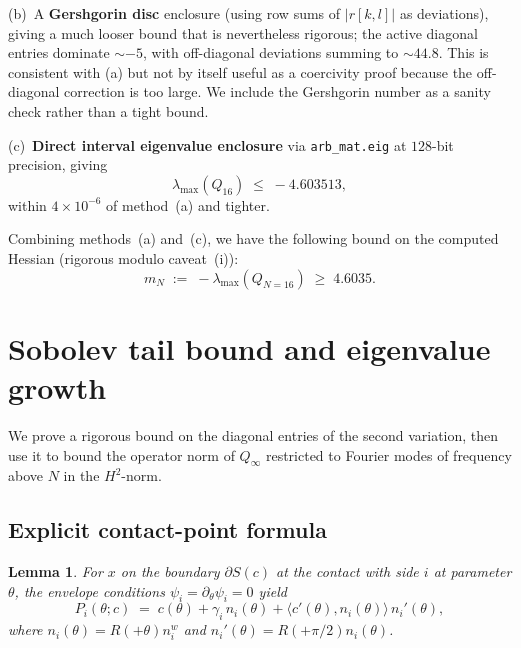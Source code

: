 \documentclass[11pt]{amsart}
\theoremstyle{plain}
\newtheorem{lemma}[theorem]{Lemma}
\theoremstyle{definition}
\begin{document}
(b)~A \textbf{Gershgorin disc} enclosure (using row sums of
$|r[k, l]|$ as deviations), giving a much looser bound that is
nevertheless rigorous; the active diagonal entries dominate
$\sim -5$, with off-diagonal deviations summing to $\sim 44.8$.  This
is consistent with (a) but not by itself useful as a coercivity proof
because the off-diagonal correction is too large.  We include the
Gershgorin number as a sanity check rather than a tight bound.

(c)~\textbf{Direct interval eigenvalue enclosure} via
\texttt{arb\_mat.eig} at $128$-bit precision, giving
\begin{equation}
  \lambda_{\max}(Q_{16}) \;\leq\; -4.603513,
\end{equation}
within $4 \times 10^{-6}$ of method~(a) and tighter.

Combining methods~(a) and~(c), we have the following bound on the
computed Hessian (rigorous modulo caveat~(i)):
\begin{equation}\label{eq:mN}
  \boxed{\; m_{N} \;:=\; -\lambda_{\max}(Q_{N=16})
                  \;\geq\; 4.6035. \;}
\end{equation}

\section{Sobolev tail bound and eigenvalue growth}\label{sec:tail-bound}

We prove a rigorous bound on the diagonal entries of the second
variation, then use it to bound the operator norm of $Q_{\infty}$
restricted to Fourier modes of frequency above $N$ in the
$H^{2}$-norm.

\subsection{Explicit contact-point formula}\label{sec:contact-pt}

\begin{lemma}\label{lem:contact-point}
For $x$ on the boundary $\partial S(c)$ at the contact with side $i$
at parameter $\theta$, the envelope conditions $\psi_{i} =
\partial_{\theta} \psi_{i} = 0$ yield
\begin{equation}\label{eq:Pi-explicit}
   P_{i}(\theta; c) \;=\; c(\theta) + \gamma_{i} \, n_{i}(\theta)
                       + \langle c'(\theta), n_{i}(\theta) \rangle
                          \, n_{i}'(\theta),
\end{equation}
where $n_{i}(\theta) = R(+\theta) n_{i}^{w}$ and $n_{i}'(\theta) =
R(+\pi/2) n_{i}(\theta)$.
\end{lemma}
\end{document}
